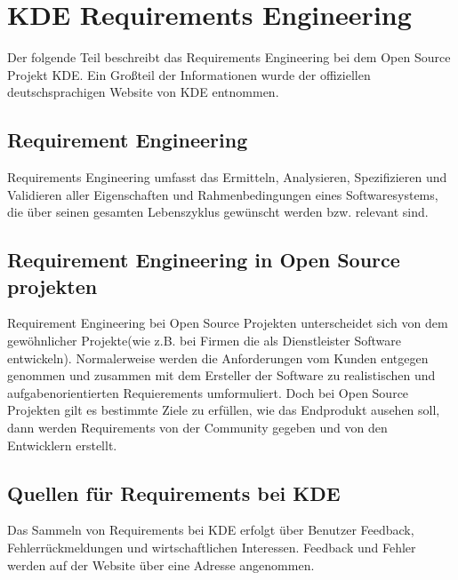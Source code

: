 \documentclass[10pt,a4paper,twocolumn]{article}
\begin{document}
\section{KDE Requirements Engineering}

Der folgende Teil beschreibt das Requirements Engineering bei dem Open Source
Projekt KDE. Ein Großteil der Informationen wurde der offiziellen
deutschsprachigen Website von KDE entnommen\cite{1}. 

\subsection{Requirement Engineering}
Requirements Engineering umfasst das Ermitteln, Analysieren, Spezifizieren und
Validieren aller Eigenschaften und Rahmenbedingungen eines Softwaresystems, die
über seinen gesamten Lebenszyklus gewünscht werden bzw. relevant sind\cite{2}.  

\subsection{Requirement Engineering in Open Source projekten}
Requirement Engineering bei Open Source Projekten unterscheidet sich von dem
gewöhnlicher Projekte(wie z.B. bei Firmen die als Dienstleister Software
entwickeln). Normalerweise werden die Anforderungen vom Kunden entgegen genommen
und zusammen mit dem Ersteller der Software zu realistischen und
aufgabenorientierten Requierements umformuliert. Doch bei Open Source Projekten
gilt es bestimmte Ziele zu erfüllen, wie das Endprodukt ausehen soll, dann
werden Requirements von der Community gegeben und von den Entwicklern erstellt.


\subsection{Quellen für Requirements bei KDE}
Das Sammeln von Requirements bei KDE erfolgt über Benutzer Feedback,
Fehlerrückmeldungen und wirtschaftlichen Interessen. Feedback und Fehler werden
auf der Website über eine Adresse angenommen\cite{3}.
\end{document}
